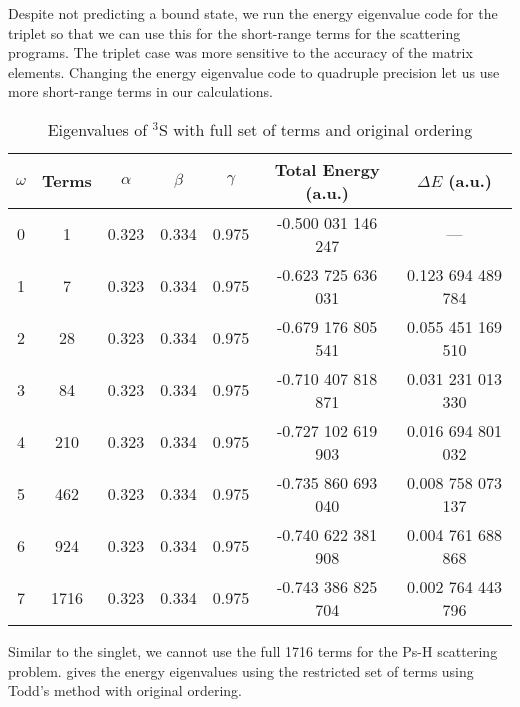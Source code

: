 \documentclass[Dissertation.tex]{subfiles}
\begin{document}
Despite not predicting a bound state, we run the energy eigenvalue code for 
the triplet so that we can use this for the short-range terms for the 
scattering programs. The triplet case was more sensitive to the accuracy of 
the matrix elements. Changing the energy eigenvalue code to quadruple 
precision let us use more short-range terms in our calculations.


\setlength{\abovecaptionskip}{6pt}   %
\setlength{\belowcaptionskip}{6pt}   %
\begin{table}
\centering
\begin{tabular}{c c c c c c c}
\toprule
$\omega$ & Terms & $\alpha$ & $\beta$ & $\gamma$ & Total Energy (a.u.) & $\Delta E$ (a.u.) \\ [0.5ex]
\midrule
0 & 1    & 0.323 & 0.334 & 0.975 & -0.500 031 146 247 & --- \\
1 & 7    & 0.323 & 0.334 & 0.975 & -0.623 725 636 031 & 0.123 694 489 784 \\
2 & 28   & 0.323 & 0.334 & 0.975 & -0.679 176 805 541 & 0.055 451 169 510 \\
3 & 84   & 0.323 & 0.334 & 0.975 & -0.710 407 818 871 & 0.031 231 013 330 \\
4 & 210  & 0.323 & 0.334 & 0.975 & -0.727 102 619 903 & 0.016 694 801 032 \\
5 & 462  & 0.323 & 0.334 & 0.975 & -0.735 860 693 040 & 0.008 758 073 137 \\
6 & 924  & 0.323 & 0.334 & 0.975 & -0.740 622 381 908 & 0.004 761 688 868 \\
7 & 1716 & 0.323 & 0.334 & 0.975 & -0.743 386 825 704 & 0.002 764 443 796 \\
\bottomrule
\end{tabular}
\caption{Eigenvalues of $^3$S with full set of terms and original ordering}
\label{tab:BoundEnergy3}
\end{table}

Similar to the singlet, we cannot use the full 1716 
terms for the Ps-H scattering problem.  gives the 
energy eigenvalues using the restricted set of terms using Todd's method
with original ordering. 
\end{document}
